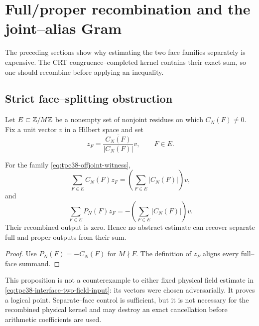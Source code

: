 \section{Full/proper recombination and the joint--alias Gram}
\label{sec:tpc38-recombined-gate}

The preceding sections show why estimating the two face families
separately is expensive.  The CRT congruence--completed kernel contains
their exact sum, so one should recombine before applying an inequality.

\subsection{Strict face--splitting obstruction}

Let \(E\subset\mathbb Z/M\mathbb Z\) be a nonempty set of nonjoint residues on which
\(C_N(F)\ne0\).  Fix a unit vector \(v\) in a Hilbert space and set
\begin{equation}
 z_F=\frac{\overline{C_N(F)}}{|C_N(F)|}v,
 \qquad F\in E.
 \label{eq:tpc38-offjoint-witness}
\end{equation}

\begin{proposition}
\label{prop:tpc38-face-splitting-obstruction}
For the family \eqref{eq:tpc38-offjoint-witness},
\begin{equation}
 \sum_{F\in E}C_N(F)z_F
 =\left(\sum_{F\in E}|C_N(F)|\right)v,
 \label{eq:tpc38-large-full-output}
\end{equation}
and
\begin{equation}
 \sum_{F\in E}P_N(F)z_F
 =-\left(\sum_{F\in E}|C_N(F)|\right)v.
 \label{eq:tpc38-large-proper-output}
\end{equation}
Their recombined output is zero.  Hence no abstract estimate can recover
separate full and proper outputs from their sum.
\end{proposition}

\begin{proof}
Use \(P_N(F)=-C_N(F)\) for \(M\nmid F\).  The definition of \(z_F\)
aligns every full--face summand.
\end{proof}

This proposition is not a counterexample to either fixed physical field
estimate in \eqref{eq:tpc38-interface-two-field-input}: its vectors were
chosen adversarially.  It proves a logical point.  Separate--face
control is sufficient, but it is not necessary for the recombined
physical kernel and may destroy an exact cancellation before arithmetic
coefficients are used.

